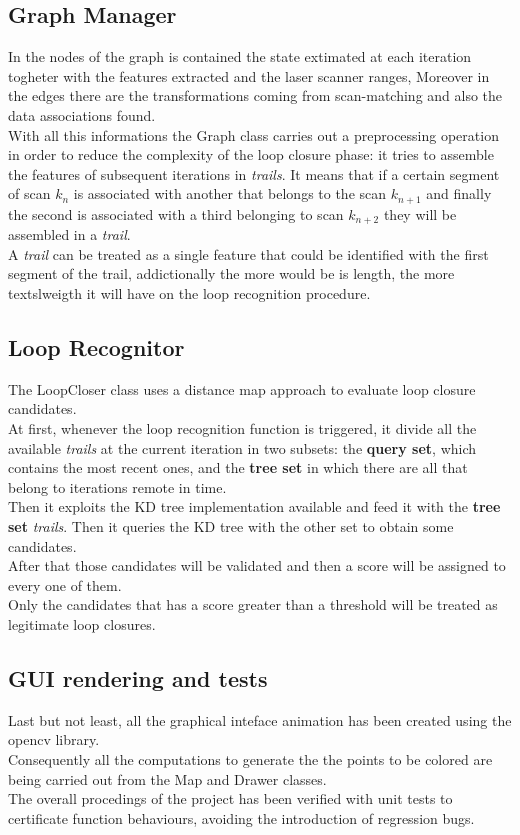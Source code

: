 \subsection{ Graph Manager}
In the nodes of the graph is contained the state extimated at each
iteration togheter with the features extracted and the laser scanner ranges,
Moreover in the edges there are the transformations coming from scan-matching
and also the data associations found.\\
With all this informations the Graph class carries out a preprocessing
operation in order to reduce the complexity of the loop closure phase:
it tries to assemble the features of subsequent iterations in \textsl{trails}.
It means that if a certain segment of scan $k_n$ is associated with another 
that belongs to the scan $k_{n+1}$ and finally the second is associated with a third
belonging to scan $k_{n+2}$ they will be assembled in a \textsl{trail}.\\
A \textsl{trail} can be treated as a single feature that could be identified
with the first segment of the trail, addictionally the more would be is length,
the more textsl{weigth} it will have on the loop recognition procedure.

\subsection{ Loop Recognitor}
The LoopCloser class uses a distance map approach to evaluate loop closure
candidates.\\At first, whenever the loop recognition function is triggered,
it divide all the available \textsl{trails} at the current iteration in two
subsets: the \textbf{query set}, which contains the most recent ones, and the 
\textbf{tree set} in which there are all that belong to iterations remote in
time.\\Then it exploits the KD tree implementation available and feed it with
the \textbf{tree set} \textsl{trails}. Then it queries the KD tree with the
other set to obtain some candidates.\\
After that those candidates will be validated and then a score will be 
assigned to every one of them.\\Only the candidates that has a score greater
than a threshold will be treated as legitimate loop closures.




\subsection{ GUI rendering and tests}
Last but not least, all the graphical inteface animation has been created
using the opencv library.\\Consequently all the computations to generate the
the points to be colored are being carried out from the Map and Drawer classes.\\
The overall procedings of the project has been verified with unit tests
to certificate function behaviours, avoiding the introduction of regression bugs.




